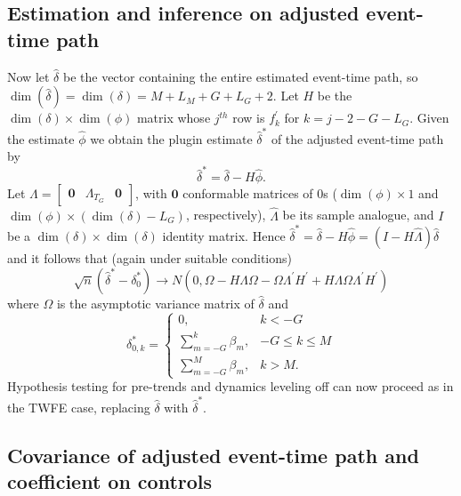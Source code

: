 \documentclass[12pt]{article}
\begin{document}
\subsection{Estimation and inference on adjusted event-time path}

Now let $\widehat{\delta}$ be the vector containing the entire estimated
event-time path, so $\dim\left(\widehat{\delta}\right)=\dim\left(\delta\right)=M+L_{M}+G+L_{G}+2$.
Let $H$ be the $\dim\left(\delta\right)\times\dim\left(\phi\right)$
matrix whose $j^{th}$ row is $f_{k}^{'}$ for $k=j-2-G-L_{G}$. Given
the estimate $\widehat{\phi}$ we obtain the plugin estimate $\widehat{\delta}^{*}$
of the adjusted event-time path by
\[
\widehat{\delta}^{*}=\widehat{\delta}-H\widehat{\phi}.
\]
Let $\Lambda=\begin{bmatrix}\boldsymbol{0} & \Lambda_{T_G} & \boldsymbol{0}\end{bmatrix}$,
with $\boldsymbol{0}$ conformable matrices of 0s ($\dim\left(\phi\right)\times1$
and $\dim\left(\phi\right)\times\left(\dim\left(\delta\right)-L_{G}\right)$,
respectively), $\widehat{\Lambda}$ be its sample analogue, and $I$
be a $\dim\left(\delta\right)\times\dim\left(\delta\right)$ identity
matrix. Hence $\widehat{\delta}^{*}=\widehat{\delta}-H\widehat{\phi}=\left(I-H\widehat{\Lambda}\right)\widehat{\delta}$
and it follows that (again under suitable conditions)
\[
\sqrt{n}\left(\widehat{\delta}^{*}-\delta_{0}^{*}\right)\to N\left(0,\Omega-H\Lambda\Omega-\Omega\Lambda^{\prime}H^{\prime}+H\Lambda\Omega\Lambda^{\prime}H^{\prime}\right)
\]
where $\Omega$ is the asymptotic variance matrix of $\hat{\delta}$ and
\[
\delta_{0,k}^{*}=\begin{cases}
0, & k<-G\\
\sum_{m=-G}^{k}\beta_{m}, & -G\le k\le M\\
\sum_{m=-G}^{M}\beta_{m}, & k>M.
\end{cases}
\]
Hypothesis testing for pre-trends and dynamics leveling off can
now proceed as in the TWFE case, replacing $\widehat{\delta}$ with
$\widehat{\delta}^{*}$.

\subsection{Covariance of adjusted event-time path and coefficient on controls}
\end{document}

